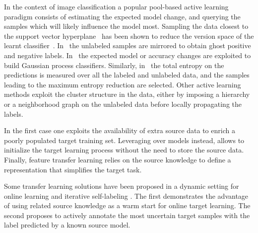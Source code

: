 \documentclass[10pt,twocolumn,letterpaper]{article}
\newcommand{\cgm}[1]{\textcolor{purple}{\textbf{CS}: #1}}
\begin{document}
In the context of image classification a popular pool-based active learning paradigm consists of
estimating the expected model change, and querying the samples which will likely influence the model most. 
Sampling the data closest to the support vector hyperplane~\cite{Schohn, Vijayanarasimhan2011} has 
been shown to reduce the version space of the learnt classifier~\cite{Tong2002}. 
In~\cite{VijayanarasimhanJG10} the unlabeled samples are mirrored to obtain ghost positive and negative labels.
In~\cite{Freytag14, VezhnevetsBF12} the expected model or accuracy changes are exploited to build Gaussian process classifiers.
Similarly, in~\cite{KovashkaVG11} the total entropy on the predictions is measured over all the labeled and unlabeled data, and the samples leading to the maximum entropy reduction are selected.
Other active learning methods exploit the cluster structure in the data, either by imposing a hierarchy \cite{Dasgupta} or a neighborhood graph on the unlabeled data \cite{Zhu03combiningactive} before locally propagating the labels.

In the first case one exploits the availability of extra source data to enrich a poorly populated target training set.
Leveraging over models instead, allows to initialize the target learning process without the need to store the source data.
Finally, feature transfer learning relies on the source knowledge to define a representation that simplifies the target task.

Some transfer learning solutions have been proposed in a dynamic setting for online learning \cite{Tommasi_BMVC_2012}
and iterative self-labeling \cite{dasvm}. The first demonstrates the advantage of using related source knowledge
as a warm start for online target learning. The second proposes to actively annotate the most uncertain target samples with the label predicted by a known source model.
\end{document}
